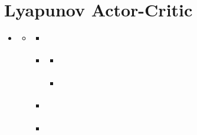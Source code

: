 \documentclass[letterpaper,10pt,english]{sphinxmanual}
\begin{document}
\chapter{Lyapunov Actor-Critic}
\label{\detokenize{algorithms/lac:lyapunov-actor-critic}}\label{\detokenize{algorithms/lac::doc}}
\begin{sphinxShadowBox}
\begin{itemize}
\item {} 
\label{\detokenize{algorithms/lac:id1}}{\hyperref[\detokenize{algorithms/lac:lyapunov-actor-critic}]{}}
\begin{itemize}
\item {} 
\label{\detokenize{algorithms/lac:id2}}{\hyperref[\detokenize{algorithms/lac:background}]{}}
\begin{itemize}
\item {} 
\label{\detokenize{algorithms/lac:id3}}{\hyperref[\detokenize{algorithms/lac:quick-facts}]{}}

\item {} 
\label{\detokenize{algorithms/lac:id4}}{\hyperref[\detokenize{algorithms/lac:key-equations}]{}}
\begin{itemize}
\item {} 
\label{\detokenize{algorithms/lac:id5}}{\hyperref[\detokenize{algorithms/lac:entropy-regularized-reinforcement-learning}]{}}

\item {} 
\label{\detokenize{algorithms/lac:id6}}{\hyperref[\detokenize{algorithms/lac:soft-actor-critic}]{}}

\end{itemize}

\item {} 
\label{\detokenize{algorithms/lac:id7}}{\hyperref[\detokenize{algorithms/lac:exploration-vs-exploitation}]{}}

\item {} 
\label{\detokenize{algorithms/lac:id8}}{\hyperref[\detokenize{algorithms/lac:pseudocode}]{}}

\end{itemize}


\end{itemize}
\end{itemize}
\end{sphinxShadowBox}
\end{document}
